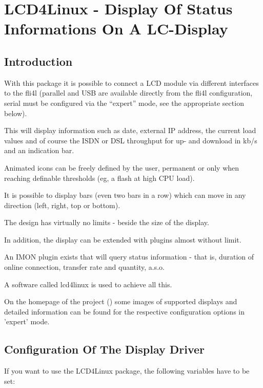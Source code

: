 {
  \section {LCD4Linux - Display Of Status Informations On A LC-Display}
}

\subsection{Introduction}

    With this package it is possible to connect a LCD module via different
    interfaces to the fli4l (parallel and USB are available directly from 
    the fli4l configuration, serial must be configured via the ``expert'' mode,
    see the appropriate section below).

    This will display information such as date, external IP address,
    the current load values and of course the ISDN or DSL throughput
    for up- and download in kb/s and an indication bar.

    Animated icons can be freely defined by the user, permanent or only when
    reaching definable thresholds (eg, a flash at high CPU load).

    It is possible to display bars (even two bars in a row) which
    can move in any direction (left, right, top or bottom).

    The design has virtually no limits - beside the size of the display.

    In addition, the display can be extended with plugins almost without limit.

    An IMON plugin exists that will query status information - that is, duration of
    online connection, transfer rate and quantity, a.s.o.

    A software called lcd4linux is used to achieve all this.

    On the homepage of the project
    	()
    some images of supported displays and detailed information
    can be found for the respective configuration options in 'expert' mode.

\subsection{Configuration Of The Display Driver}

    If you want to use the LCD4Linux package, the following variables have to be
    set:


